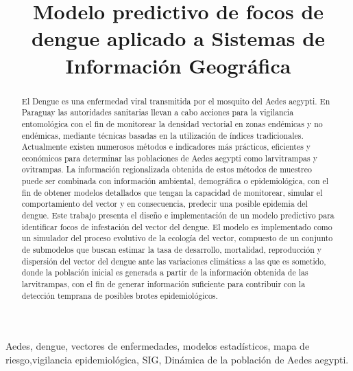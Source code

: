 \documentclass[conference]{IEEEtran}
\begin{document}
%
\title{Modelo predictivo de focos de dengue aplicado a Sistemas de Información Geográfica}


\author{
}
\maketitle

\begin{abstract}
El Dengue es una enfermedad viral transmitida por el mosquito del Aedes aegypti. En Paraguay las autoridades sanitarias llevan a cabo acciones para la vigilancia entomológica con el fin de monitorear la densidad vectorial en zonas endémicas y no endémicas, mediante técnicas basadas en la utilización de índices tradicionales. Actualmente existen numerosos métodos e indicadores más prácticos, eficientes y económicos para determinar las poblaciones de Aedes aegypti como larvitrampas y ovitrampas. La información regionalizada obtenida de estos métodos de muestreo puede ser combinada con información ambiental, demográfica o epidemiológica, con el fin de obtener modelos detallados que tengan la capacidad de monitorear, simular el comportamiento del vector y en consecuencia, predecir una posible epidemia del dengue. Este trabajo presenta el diseño e implementación de un modelo predictivo para identificar focos de infestación del vector del dengue. El modelo es implementado como un simulador del proceso evolutivo de la ecología del vector, compuesto de un conjunto de submodelos que buscan estimar la tasa de desarrollo, mortalidad, reproducción y dispersión del vector del dengue ante las variaciones climáticas a las que es sometido, donde la población inicial es generada a partir de la información obtenida de las larvitrampas, con el fin de generar información suficiente para contribuir con la detección temprana de posibles brotes epidemiológicos.
\end{abstract}

\begin{IEEEkeywords}
Aedes, dengue, vectores de enfermedades, modelos estadísticos, mapa de riesgo,vigilancia  epidemiológica, SIG, Dinámica de la población de Aedes aegypti.
\end{IEEEkeywords}

\IEEEpeerreviewmaketitle






\printbibliography

\end{document}
